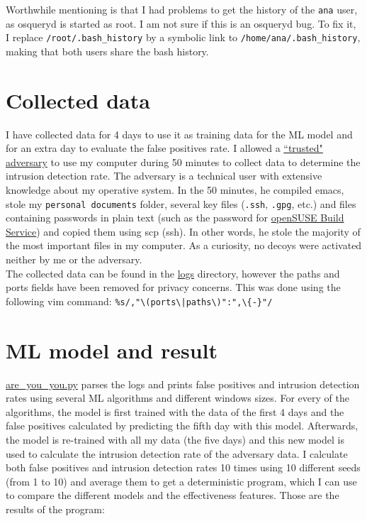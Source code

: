 \documentclass[oneside, 12pt]{article}
\begin{document}
Worthwhile mentioning is that I had problems to get the history of the \texttt{ana} user, as osqueryd is started as root.
I am not sure if this is an osqueryd bug.
To fix it, I replace \texttt{/root/.bash\_history} by a symbolic link to \texttt{/home/ana/.bash\_history}, making that both users share the bash history.


\section{Collected data}

I have collected data for 4 days to use it as training data for the ML model and for an extra day to evaluate the false positives rate.
I allowed a \hyperref[agraul]{``trusted" adversary} to use my computer during 50 minutes to collect data to determine the intrusion detection rate.
The adversary is a technical user with extensive knowledge about my operative system.
In the 50 minutes, he compiled emacs, stole my \texttt{personal documents} folder, several key files (\texttt{.ssh}, \texttt{.gpg}, etc.) and files containing passwords in plain text (such as the password for \href{https://build.opensuse.org}{openSUSE Build Service}) and copied them using scp (ssh).
In other words, he stole the majority of the most important files in my computer.
As a curiosity, no decoys were activated neither by me or the adversary.\\

The collected data can be found in the \href{https://github.com/Ana06/are-you-you/tree/master/logs}{logs} directory,
however the paths and ports fields have been removed for privacy concerns.
This was done using the following vim command:
\texttt{\%s/,"\textbackslash{}(ports\textbackslash{}|paths\textbackslash{})":",\textbackslash{}\{-\}"/}

\section{ML model and result}

\href{https://github.com/Ana06/are-you-you/blob/master/are_you_you.py}{are\_you\_you.py} parses the logs and prints false positives and intrusion detection rates using several ML algorithms and different windows sizes.
For every of the algorithms, the model is first trained with the data of the first 4 days and the false positives calculated by predicting the fifth day with this model.
Afterwards, the model is re-trained with all my data (the five days) and this new model is used to calculate the intrusion detection rate of the adversary data.
I calculate both false positives and intrusion detection rates 10 times using 10 different seeds (from 1 to 10) and average them to get a deterministic program, which I can use to compare the different models and the effectiveness features.
Those are the results of the program:
\end{document}
